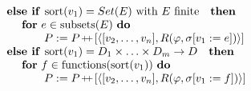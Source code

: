 \documentclass{article}
\providecommand{\concat}{\ensuremath{\hspace{0.12em}\raisebox{0.2ex}{\text{\scriptsize+}\!\text{\scriptsize+}}\hspace{0.12em}}}
\begin{document}
\[
\begin{tabular}{l}
\qquad \qquad \qquad $\text{\textbf{else if }}\mathrm{sort}(v_{1})=Set(E)$
with $E$ finite$\text{ \textbf{then}}$ \\ 
\qquad \qquad \qquad \qquad \textbf{for} $e\in \mathrm{subsets}(E)$ \textbf{%
do} \\ 
\qquad \qquad \qquad \qquad \qquad $P:=P\concat\lbrack \left\langle
[v_{2},\ldots ,v_{n}],R(\varphi ,\sigma \lbrack v_{1}:=e])\right\rangle ]$
\\ 
\qquad \qquad \qquad $\text{\textbf{else if }}\mathrm{sort}%
(v_{1})=D_{1}\times \ldots \times D_{m}\rightarrow D\text{ \textbf{then}}$
\\ 
\qquad \qquad \qquad \qquad \textbf{for} $f\in \mathrm{functions}(\mathrm{%
sort}(v_{1}))$ \textbf{do} \\ 
\qquad \qquad \qquad \qquad \qquad $P:=P\concat\lbrack \left\langle
[v_{2},\ldots ,v_{n}],R(\varphi ,\sigma \lbrack v_{1}:=f])\right\rangle ]$%
\end{tabular}%
\]
\end{document}

